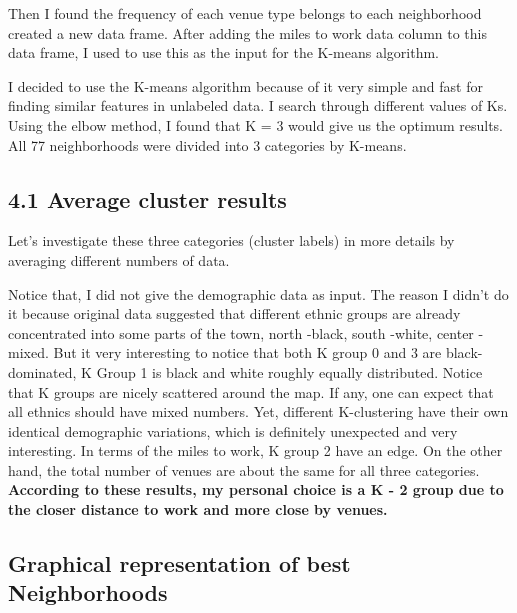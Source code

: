 \documentclass[11pt]{article}
\begin{document}
Then I found the frequency of each venue type belongs to each
neighborhood created a new data frame. After adding the miles to work
data column to this data frame, I used to use this as the input for the
K-means algorithm.

I decided to use the K-means algorithm because of it very simple and
fast for finding similar features in unlabeled data. I search through
different values of Ks. Using the elbow method, I found that K = 3 would
give us the optimum results. All 77 neighborhoods were divided into 3
categories by K-means.

    \hypertarget{average-cluster-results}{%
\subsection{4.1 Average cluster
results}\label{average-cluster-results}}

Let's investigate these three categories (cluster labels) in more details by averaging
different numbers of data.

\begin{center}
    \end{center}
            
    Notice that, I did not give the demographic data as input. The reason I
didn't do it because original data suggested that different ethnic
groups are already concentrated into some parts of the town, north
-black, south -white, center -mixed. But it very interesting to notice
that both K group 0 and 3 are black-dominated, K Group 1 is black and
white roughly equally distributed. Notice that K groups are nicely
scattered around the map. If any, one can expect that all ethnics should
have mixed numbers. Yet, different K-clustering have their own identical
demographic variations, which is definitely unexpected and very
interesting. In terms of the miles to work, K group 2 have an edge. On
the other hand, the total number of venues are about the same for all
three categories. \textbf{According to these results, my personal choice
is a K - 2 group due to the closer distance to work and more close by
venues.}

\newpage
    \hypertarget{graphical-representation-of-best-neighborhoods}{%
\subsection{Graphical representation of best
Neighborhoods}\label{graphical-representation-of-best-neighborhoods}}
\end{document}
